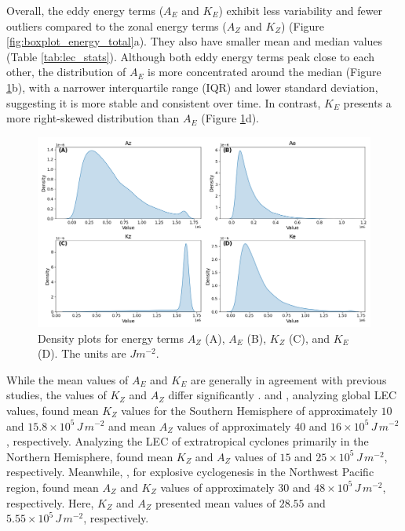 Overall, the eddy energy terms ($A_E$ and $K_E$) exhibit less variability and fewer outliers compared to the zonal energy terms ($A_Z$ and $K_Z$) (Figure \ref{fig:boxplot_energy_total}a). They also have smaller mean and median values (Table \ref{tab:lec_stats}). Although both eddy energy terms peak close to each other, the distribution of $A_E$ is more concentrated around the median (Figure \ref{fig:ridge_plot_Energy_Terms_total}b), with a narrower interquartile range (IQR) and lower standard deviation, suggesting it is more stable and consistent over time. In contrast, $K_E$ presents a more right-skewed distribution than $A_E$ (Figure \ref{fig:ridge_plot_Energy_Terms_total}d).


\begin{figure}[!htbp]
\centering
\includegraphics[width=\textwidth]{figs_5/ridge_plot_Energy_Terms_total.png}
\caption[Density Plots - Energy Terms]{Density plots for energy terms $A_Z$ (A), $A_E$ (B), $K_Z$ (C), and $K_E$ (D). The units are $J m^{-2}$.}
\label{fig:ridge_plot_Energy_Terms_total}
\end{figure}

While the mean values of $A_E$ and $K_E$ are generally in agreement with previous studies, the values of $K_Z$ and $A_Z$ differ significantly \citep[e.g.,]{michaelides1999quasi,veiga2008analysis,dias2011energy,pezza2014large}. \citet{li2007lorenz} and \citet{veiga2013global}, analyzing global LEC values, found mean $K_Z$ values for the Southern Hemisphere of approximately $10$ and $15.8 \times 10^5 \, J \, m^{-2}$ and mean $A_Z$ values of approximately $40$ and $16 \times 10^5 \, J \, m^{-2}$, respectively. Analyzing the LEC of extratropical cyclones primarily in the Northern Hemisphere, \citet{smith1980energetics} found mean $K_Z$ and $A_Z$ values of $15$ and $25 \times 10^5 \, J \, m^{-2}$, respectively. Meanwhile, \citet{black2013universal}, for explosive cyclogenesis in the Northwest Pacific region, found mean $A_Z$ and $K_Z$ values of approximately $30$ and $48 \times 10^5 \, J \, m^{-2}$, respectively. Here, $K_Z$ and $A_Z$ presented mean values of $28.55$ and $5.55 \times 10^5 \, J \, m^{-2}$, respectively.


